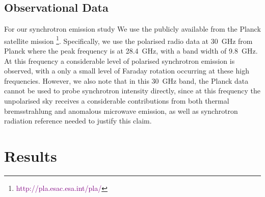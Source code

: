\documentclass[12pt, a4 paper]{article}
\newcommand{\Andrew}[1]{\textcolor{dg}{#1}}
\newcommand{\Vasu}[1]{{\color{purple}#1}}
\begin{document}

\subsection{Observational Data}
For our synchrotron emission study We use the publicly available from the Planck satellite mission \footnote{\textcolor{purple}{http://pla.esac.esa.int/pla/}}. Specifically, we use the polarised radio data at 30~GHz from Planck where the peak frequency is at 28.4~GHz, with a band width of 9.8~GHz. At this frequency a considerable level of polarised synchrotron emission is observed, with a only a small level of Faraday rotation occurring at these high frequencies. However, we also note that in this 30~GHz band, the Planck data cannot be used to probe synchrotron intensity directly, since at this frequency the unpolarised sky receives a considerable contributions from both thermal bremsstrahlung and anomalous microwave emission, as well as synchrotron radiation \Andrew{reference needed to justify this claim}. 


\section{Results}
\label{Results}

\end{document}
